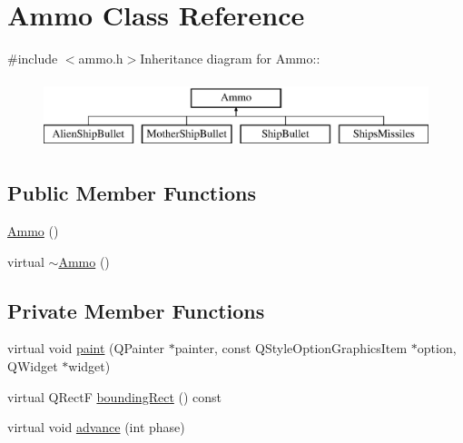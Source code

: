 \hypertarget{class_ammo}{
\section{Ammo Class Reference}
\label{class_ammo}
}


{\ttfamily \#include $<$ammo.h$>$}Inheritance diagram for Ammo::\begin{figure}[H]
\begin{center}
\leavevmode
\includegraphics[height=2cm]{class_ammo}
\end{center}
\end{figure}
\subsection*{Public Member Functions}
\begin{DoxyCompactItemize}
\item 
\hyperlink{class_ammo_a6745bf955cceda43c50dc15c76157e64}{Ammo} ()
\item 
virtual \hyperlink{class_ammo_a90602c6481c6a66d4747306f90a3ebc7}{$\sim$Ammo} ()
\end{DoxyCompactItemize}
\subsection*{Private Member Functions}
\begin{DoxyCompactItemize}
\item 
virtual void \hyperlink{class_ammo_a3f4c8157fab369e46bac4bb88348d8c1}{paint} (QPainter $\ast$painter, const QStyleOptionGraphicsItem $\ast$option, QWidget $\ast$widget)
\item 
virtual QRectF \hyperlink{class_ammo_a4c5548e35a4599210f0599328ef03f01}{boundingRect} () const 
\item 
virtual void \hyperlink{class_ammo_a257fb0cdbb4302da65b89447fa6caeaa}{advance} (int phase)
\end{DoxyCompactItemize}
